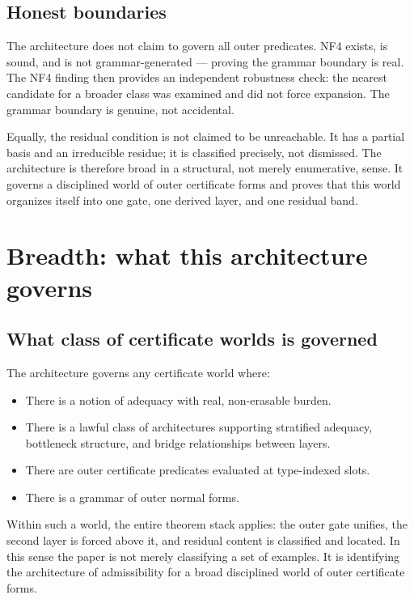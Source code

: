 \documentclass[11pt]{article}
\theoremstyle{plain}
\theoremstyle{definition}
\theoremstyle{remark}
\begin{document}
\subsection{Honest boundaries}

The architecture does not claim to govern all outer predicates.  NF4 exists,
is sound, and is not grammar-generated --- proving the grammar boundary is
real.  The NF4 finding then provides an independent robustness check: the
nearest candidate for a broader class was examined and did not force
expansion.  The grammar boundary is genuine, not accidental.

Equally, the residual condition is not claimed to be unreachable.  It has a
partial basis and an irreducible residue; it is classified precisely, not
dismissed.
The architecture is therefore broad in a structural, not merely enumerative,
sense.  It governs a disciplined world of outer certificate forms and proves
that this world organizes itself into one gate, one derived layer, and one
residual band.

\section{Breadth: what this architecture governs}
\label{sec:breadth}

\subsection{What class of certificate worlds is governed}

The architecture governs any certificate world where:
\begin{itemize}
  \item There is a notion of adequacy with real, non-erasable burden.
  \item There is a lawful class of architectures supporting stratified
    adequacy, bottleneck structure, and bridge relationships between layers.
  \item There are outer certificate predicates evaluated at type-indexed
    slots.
  \item There is a grammar of outer normal forms.
\end{itemize}

Within such a world, the entire theorem stack applies: the outer gate
unifies, the second layer is forced above it, and residual content is
classified and located.
In this sense the paper is not merely classifying a set of examples.  It is
identifying the architecture of admissibility for a broad disciplined world
of outer certificate forms.
\end{document}
